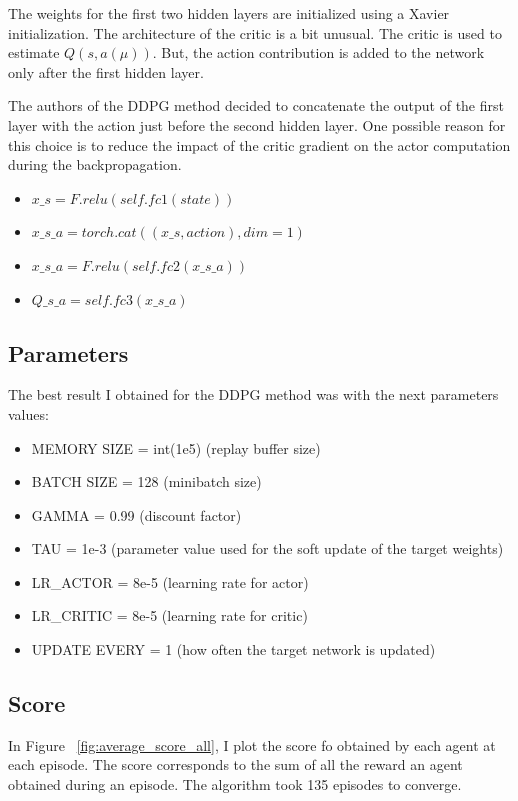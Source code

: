 \documentclass[12pt]{article}
\begin{document}
The weights for the first two hidden layers are initialized using a Xavier initialization.
The architecture of the critic is a bit unusual. The critic is used to estimate $Q(s, a(\mu))$. But, the action contribution is added to the network only after the first hidden layer.

The authors of the DDPG method\cite{LHDWR14} decided to concatenate the output of the first layer with the action just before the second hidden layer. One possible reason for this choice is to reduce the impact of the critic gradient on the actor computation during the backpropagation.


\begin{itemize}
\item $x\_s   = F.relu(self.fc1(state))$
\item $x\_s\_a = torch.cat((x\_s, action), dim=1)$
\item $x\_s\_a = F.relu(self.fc2(x\_s\_a))$
\item $Q\_s\_a  = self.fc3(x\_s\_a)$
\end{itemize}

\subsection{Parameters}
The best result I obtained for the DDPG method was with the next parameters values:

\begin{itemize}
\item MEMORY SIZE = int(1e5) (replay buffer size)
\item BATCH SIZE = 128  (minibatch size)
\item GAMMA = 0.99  (discount factor)
\item TAU = 1e-3  (parameter value used for the soft update of the target weights)
\item LR\_ACTOR = 8e-5  (learning rate for actor)
\item LR\_CRITIC = 8e-5  (learning rate for critic)
\item UPDATE EVERY = 1  (how often the target network is updated)
\end{itemize}


\subsection{Score}
In Figure ~\ref{fig:average_score_all}, I plot the score fo obtained by each agent at each episode. The score corresponds to the sum of all the reward an agent obtained during an episode. The algorithm took 135 episodes to converge. 
\end{document}
